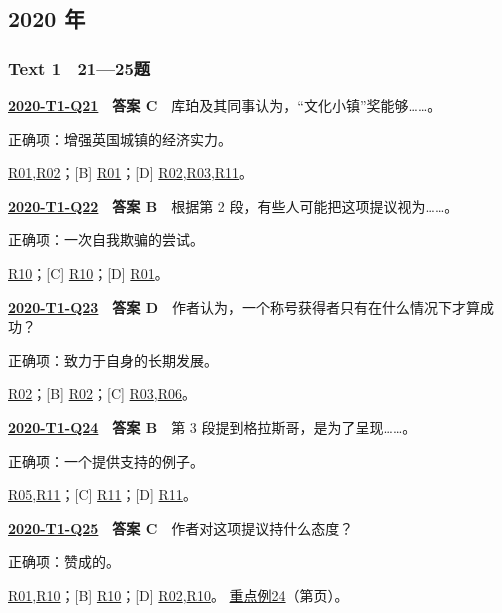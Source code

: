 \documentclass[11pt,a4paper]{article}
\begin{document}
\subsection{2020 年}\label{year-2020}
\subsubsection{Text 1　21—25题}
\label{idx-2020-T1-Q21}
\noindent\textbf{\href{https://zj139.github.io/math-notes/english/7f03a0ee86b303996bed3f18/\#q21}{2020-T1-Q21}　答案 C}　库珀及其同事认为，“文化小镇”奖能够……。\par\nopagebreak
\noindent 正确项：增强英国城镇的经济实力。\par\nopagebreak
\noindent [A] \hyperref[cat-R01]{R01},\hyperref[cat-R02]{R02}；[B] \hyperref[cat-R01]{R01}；[D] \hyperref[cat-R02]{R02},\hyperref[cat-R03]{R03},\hyperref[cat-R11]{R11}。
\par\smallskip
{}\label{idx-2020-T1-Q22}
\noindent\textbf{\href{https://zj139.github.io/math-notes/english/7f03a0ee86b303996bed3f18/\#q22}{2020-T1-Q22}　答案 B}　根据第 2 段，有些人可能把这项提议视为……。\par\nopagebreak
\noindent 正确项：一次自我欺骗的尝试。\par\nopagebreak
\noindent [A] \hyperref[cat-R10]{R10}；[C] \hyperref[cat-R10]{R10}；[D] \hyperref[cat-R01]{R01}。
\par\smallskip
{}\label{idx-2020-T1-Q23}
\noindent\textbf{\href{https://zj139.github.io/math-notes/english/7f03a0ee86b303996bed3f18/\#q23}{2020-T1-Q23}　答案 D}　作者认为，一个称号获得者只有在什么情况下才算成功？\par\nopagebreak
\noindent 正确项：致力于自身的长期发展。\par\nopagebreak
\noindent [A] \hyperref[cat-R02]{R02}；[B] \hyperref[cat-R02]{R02}；[C] \hyperref[cat-R03]{R03},\hyperref[cat-R06]{R06}。
\par\smallskip
{}\label{idx-2020-T1-Q24}
\noindent\textbf{\href{https://zj139.github.io/math-notes/english/7f03a0ee86b303996bed3f18/\#q24}{2020-T1-Q24}　答案 B}　第 3 段提到格拉斯哥，是为了呈现……。\par\nopagebreak
\noindent 正确项：一个提供支持的例子。\par\nopagebreak
\noindent [A] \hyperref[cat-R05]{R05},\hyperref[cat-R11]{R11}；[C] \hyperref[cat-R11]{R11}；[D] \hyperref[cat-R11]{R11}。
\par\smallskip
{}\label{idx-2020-T1-Q25}
\noindent\textbf{\href{https://zj139.github.io/math-notes/english/7f03a0ee86b303996bed3f18/\#q25}{2020-T1-Q25}　答案 C}　作者对这项提议持什么态度？\par\nopagebreak
\noindent 正确项：赞成的。\par\nopagebreak
\noindent [A] \hyperref[cat-R01]{R01},\hyperref[cat-R10]{R10}；[B] \hyperref[cat-R10]{R10}；[D] \hyperref[cat-R02]{R02},\hyperref[cat-R10]{R10}。
\hyperref[case-2020-T1-Q25]{重点例24}（第\pageref{case-2020-T1-Q25}页）。
\par\smallskip
\end{document}
